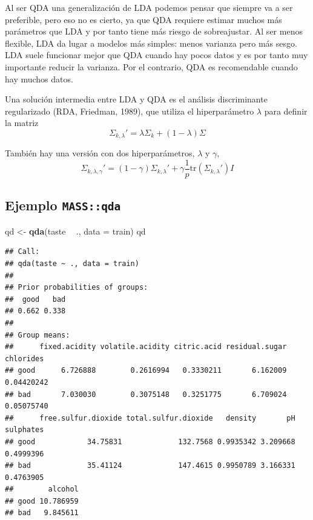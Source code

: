 \documentclass[
]{book}
\newenvironment{Shaded}{\begin{snugshade}}{\end{snugshade}}
\newcommand{\DataTypeTok}[1]{\textcolor[rgb]{0.13,0.29,0.53}{#1}}
\newcommand{\KeywordTok}[1]{\textcolor[rgb]{0.13,0.29,0.53}{\textbf{#1}}}
\newcommand{\NormalTok}[1]{#1}
\newcommand{\OperatorTok}[1]{\textcolor[rgb]{0.81,0.36,0.00}{\textbf{#1}}}
\newcommand{\StringTok}[1]{\textcolor[rgb]{0.31,0.60,0.02}{#1}}
\theoremstyle{break}
\theoremstyle{definition}
\theoremstyle{definition}
\theoremstyle{definition}
\theoremstyle{remark}
\begin{document}
Al ser QDA una generalización de LDA podemos pensar que siempre va a ser preferible, pero eso no es cierto, ya que QDA requiere estimar muchos más parámetros que LDA y por tanto tiene más riesgo de sobreajustar. Al ser menos flexible, LDA da lugar a modelos más simples: menos varianza pero más sesgo. LDA suele funcionar mejor que QDA cuando hay pocos datos y es por tanto muy importante reducir la varianza. Por el contrario, QDA es recomendable cuando hay muchos datos.

Una solución intermedia entre LDA y QDA es el análisis discriminante regularizado (RDA, Friedman, 1989), que utiliza el hiperparámetro \(\lambda\) para definir la matriz
\[\Sigma_{k,\lambda}' = \lambda\Sigma_k + (1 - \lambda) \Sigma
\]

También hay una versión con dos hiperparámetros, \(\lambda\) y \(\gamma\),
\[\Sigma_{k,\lambda,\gamma}' = (1 - \gamma) \Sigma_{k,\lambda}' + \gamma \frac{1}{p} \mbox{tr} (\Sigma_{k,\lambda}')I
\]

\hypertarget{ejemplo-massqda}{%
\subsection{\texorpdfstring{Ejemplo \texttt{MASS::qda}}{Ejemplo MASS::qda}}\label{ejemplo-massqda}}

\begin{Shaded}
\begin{Highlighting}[]
\NormalTok{qd <-}\StringTok{ }\KeywordTok{qda}\NormalTok{(taste }\OperatorTok{~}\StringTok{ }\NormalTok{., }\DataTypeTok{data =}\NormalTok{ train)}
\NormalTok{qd}
\end{Highlighting}
\end{Shaded}

\begin{verbatim}
## Call:
## qda(taste ~ ., data = train)
## 
## Prior probabilities of groups:
##  good   bad 
## 0.662 0.338 
## 
## Group means:
##      fixed.acidity volatile.acidity citric.acid residual.sugar  chlorides
## good      6.726888        0.2616994   0.3330211       6.162009 0.04420242
## bad       7.030030        0.3075148   0.3251775       6.709024 0.05075740
##      free.sulfur.dioxide total.sulfur.dioxide   density       pH sulphates
## good            34.75831             132.7568 0.9935342 3.209668 0.4999396
## bad             35.41124             147.4615 0.9950789 3.166331 0.4763905
##        alcohol
## good 10.786959
## bad   9.845611
\end{verbatim}

\begin{Shaded}
\end{Shaded}
\end{document}
